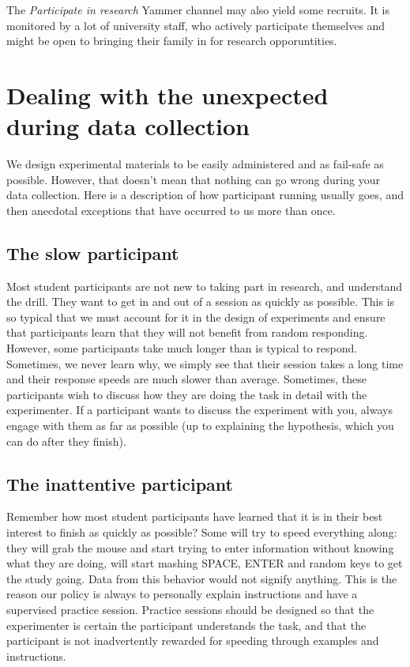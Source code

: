 \documentclass[
  12pt,
]{book}
\begin{document}
The \emph{Participate in research} Yammer channel may also yield some recruits. It is monitored by a lot of university staff, who actively participate themselves and might be open to bringing their family in for research opporuntities.

\chapter{Dealing with the unexpected during data collection}\label{dealing-with-the-unexpected-during-data-collection}

We design experimental materials to be easily administered and as fail-safe as possible. However, that doesn't mean that nothing can go wrong during your data collection. Here is a description of how participant running usually goes, and then anecdotal exceptions that have occurred to us more than once.

\section{The slow participant}\label{the-slow-participant}

Most student participants are not new to taking part in research, and understand the drill. They want to get in and out of a session as quickly as possible. This is so typical that we must account for it in the design of experiments and ensure that participants learn that they will not benefit from random responding. However, some participants take much longer than is typical to respond. Sometimes, we never learn why, we simply see that their session takes a long time and their response speeds are much slower than average. Sometimes, these participants wish to discuss how they are doing the task in detail with the experimenter. If a participant wants to discuss the experiment with you, always engage with them as far as possible (up to explaining the hypothesis, which you can do after they finish).

\section{The inattentive participant}\label{the-inattentive-participant}

Remember how most student participants have learned that it is in their best interest to finish as quickly as possible? Some will try to speed everything along: they will grab the mouse and start trying to enter information without knowing what they are doing, will start mashing SPACE, ENTER and random keys to get the study going. Data from this behavior would not signify anything. This is the reason our policy is always to personally explain instructions and have a supervised practice session. Practice sessions should be designed so that the experimenter is certain the participant understands the task, and that the participant is not inadvertently rewarded for speeding through examples and instructions.
\end{document}
